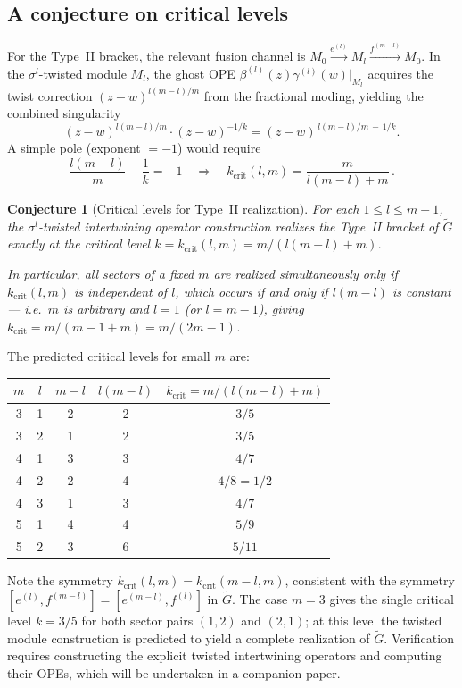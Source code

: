 \documentclass[12pt]{article}
\theoremstyle{plain}
\newtheorem{conjecture}[theorem]{Conjecture}
\theoremstyle{definition}
\theoremstyle{remark}
\newcommand{\gtil}{\widetilde{G}}
\newcommand{\bl}[1]{\beta^{(#1)}}
\newcommand{\gl}[1]{\gamma^{(#1)}}
\begin{document}
\subsection{A conjecture on critical levels}
For the Type~II bracket, the relevant fusion channel is
$M_0 \xrightarrow{e^{(l)}} M_l \xrightarrow{f^{(m-l)}} M_0$.
In the $\sigma^l$-twisted module $M_l$, the ghost OPE
$\bl{l}(z)\gl{l}(w)\big|_{M_l}$ acquires the twist correction $(z-w)^{l(m-l)/m}$
from the fractional moding, yielding the combined singularity
\[
  (z-w)^{l(m-l)/m} \cdot (z-w)^{-1/k}
  = (z-w)^{\,l(m-l)/m\,-\,1/k}.
\]
A simple pole (exponent $=-1$) would require
\begin{equation}\label{eq:critical-level}
  \frac{l(m-l)}{m} - \frac{1}{k} = -1
  \quad\Longrightarrow\quad
  k_{\mathrm{crit}}(l,m) = \frac{m}{l(m-l)+m}\,.
\end{equation}
\begin{conjecture}[Critical levels for Type~II realization]\label{conj:critical}
  For each $1\leq l\leq m-1$, the $\sigma^l$-twisted intertwining operator
  construction realizes the Type~II bracket of $\gtil$ exactly at the
  critical level $k=k_{\mathrm{crit}}(l,m)=m/(l(m-l)+m)$.
  
  In particular, all sectors of a fixed $m$ are realized simultaneously
  only if $k_{\mathrm{crit}}(l,m)$ is independent of $l$, which occurs
  if and only if $l(m-l)$ is constant --- i.e.\ $m$ is arbitrary and
  $l=1$ (or $l=m-1$), giving $k_{\mathrm{crit}}=m/(m-1+m)=m/(2m-1)$.
\end{conjecture}
The predicted critical levels for small $m$ are:
\medskip
\begin{center}
\begin{tabular}{ccccc}
\toprule
$m$ & $l$ & $m-l$ & $l(m-l)$ & $k_{\mathrm{crit}}=m/(l(m-l)+m)$\\
\midrule
3 & 1 & 2 & 2 & $3/5$\\
3 & 2 & 1 & 2 & $3/5$\\
4 & 1 & 3 & 3 & $4/7$\\
4 & 2 & 2 & 4 & $4/8=1/2$\\
4 & 3 & 1 & 3 & $4/7$\\
5 & 1 & 4 & 4 & $5/9$\\
5 & 2 & 3 & 6 & $5/11$\\
\bottomrule
\end{tabular}
\end{center}
\medskip
Note the symmetry $k_{\mathrm{crit}}(l,m)=k_{\mathrm{crit}}(m-l,m)$,
consistent with the symmetry $[e^{(l)},f^{(m-l)}]=[e^{(m-l)},f^{(l)}]$ in $\gtil$.
The case $m=3$ gives the single critical level $k=3/5$ for both sector pairs
$(1,2)$ and $(2,1)$; at this level the twisted module construction is predicted
to yield a complete realization of $\gtil$.
Verification requires constructing the explicit twisted intertwining operators
and computing their OPEs, which will be undertaken in a companion paper.
\end{document}
